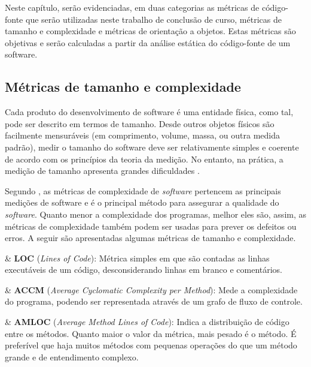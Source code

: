 Neste capítulo, serão evidenciadas, em duas categorias as métricas de código-fonte que serão utilizadas neste trabalho de conclusão de curso, métricas de tamanho e complexidade e métricas de orientação a objetos. Estas métricas são objetivas e serão calculadas a partir da análise estática do código-fonte de um software. 

\subsection{Métricas de tamanho e complexidade}

Cada produto do desenvolvimento de software é uma entidade física, como tal, pode ser descrito em termos de tamanho. Desde outros objetos físicos são facilmente mensuráveis (em comprimento, volume, massa, ou outra medida padrão), medir o tamanho do software deve ser relativamente simples e coerente de acordo com os princípios da teoria da medição. No entanto, na prática, a medição de tamanho apresenta grandes dificuldades \cite{Fenton98}. 

Segundo , as métricas de complexidade de  \textit{software} pertencem as principais medições de software e é o principal método para assegurar a qualidade do \textit{software}. Quanto menor a complexidade dos programas, melhor eles são, assim, as métricas de complexidade também podem ser usadas para prever os defeitos ou erros. A seguir são apresentadas algumas métricas de tamanho e complexidade.

\begin{easylist}[itemize]

	& \textbf{LOC} (\textit{Lines of Code}): Métrica simples em que são contadas as linhas executáveis de um código, desconsiderando linhas em branco e comentários.  \cite{metricsandmodels} 
		
	& \textbf{ACCM} (\textit{Average Cyclomatic Complexity per Method}): Mede a complexidade do programa, podendo ser representada através de um grafo de fluxo de controle. \cite{McCabe76}

	& \textbf{AMLOC} (\textit{Average Method Lines of Code}): Indica a distribuição de código entre os métodos. Quanto maior o valor da métrica, mais pesado é o método. É preferível que haja muitos métodos com pequenas operações do que um método grande e de entendimento complexo. \cite{Meirelles2013}
	
\end{easylist}

